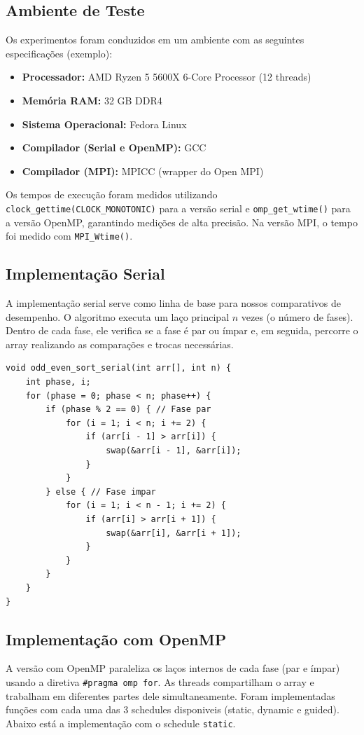 \documentclass[12pt, a4paper]{article}
\begin{document}
\subsection{Ambiente de Teste}
Os experimentos foram conduzidos em um ambiente com as seguintes especificações (exemplo):
\begin{itemize}
    \item \textbf{Processador:} AMD Ryzen 5 5600X 6-Core Processor (12 threads)
    \item \textbf{Memória RAM:} 32 GB DDR4
    \item \textbf{Sistema Operacional:} Fedora Linux
    \item \textbf{Compilador (Serial e OpenMP):} GCC
    \item \textbf{Compilador (MPI):} MPICC (wrapper do Open MPI)
\end{itemize}
Os tempos de execução foram medidos utilizando \texttt{clock\_gettime(CLOCK\_MONOTONIC)} para a versão serial e \texttt{omp\_get\_wtime()} para a versão OpenMP, garantindo medições de alta precisão. Na versão MPI, o tempo foi medido com \texttt{MPI\_Wtime()}.

\subsection{Implementação Serial}
A implementação serial serve como linha de base para nossos comparativos de desempenho. O algoritmo executa um laço principal $n$ vezes (o número de fases). Dentro de cada fase, ele verifica se a fase é par ou ímpar e, em seguida, percorre o array realizando as comparações e trocas necessárias.

\begin{lstlisting}[caption={Trecho do laço principal da versão serial.}, label=lst:serial]
void odd_even_sort_serial(int arr[], int n) {
    int phase, i;
    for (phase = 0; phase < n; phase++) {
        if (phase % 2 == 0) { // Fase par
            for (i = 1; i < n; i += 2) {
                if (arr[i - 1] > arr[i]) {
                    swap(&arr[i - 1], &arr[i]);
                }
            }
        } else { // Fase impar
            for (i = 1; i < n - 1; i += 2) {
                if (arr[i] > arr[i + 1]) {
                    swap(&arr[i], &arr[i + 1]);
                }
            }
        }
    }
}
\end{lstlisting}

\subsection{Implementação com OpenMP}
A versão com OpenMP paraleliza os laços internos de cada fase (par e ímpar) usando a diretiva \texttt{\#pragma omp for}. As threads compartilham o array e trabalham em diferentes partes dele simultaneamente. Foram implementadas funções com cada uma das 3 schedules disponiveis (static, dynamic e guided). Abaixo está a implementação com o schedule \texttt{static}.
\end{document}
